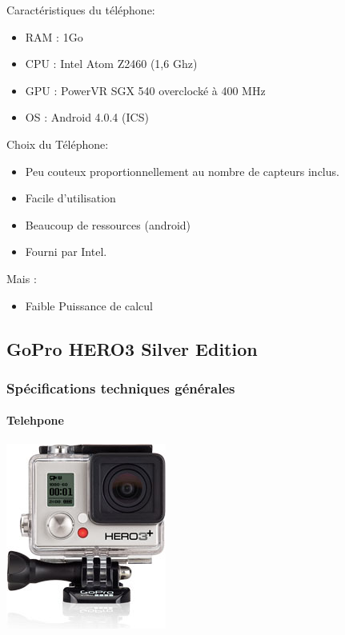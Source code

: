 \documentclass[transparent]{beamer}
\begin{document}
\begin{frame} 
	\begin{block}{Caractéristiques du téléphone:}
			\begin{itemize}
				\item RAM : 1Go
				\item CPU : Intel Atom Z2460 (1,6 Ghz)
				\item GPU : PowerVR SGX 540 overclocké à 400 MHz
				\item OS : Android 4.0.4 (ICS)
			\end{itemize}
	\end{block}
	\begin{block}{Choix du Téléphone:}
			\begin{itemize}
				\item Peu couteux proportionnellement au nombre de capteurs inclus.
				\item Facile d'utilisation
				\item Beaucoup de ressources (android)
				\item Fourni par Intel.
			\end{itemize}
	\end{block}
	\begin{block}{Mais :}
			\begin{itemize}
				\item Faible Puissance de calcul
			\end{itemize}
	\end{block}

\end{frame}

\subsection{GoPro HERO3 Silver Edition}
\begin{frame}
	\frametitle{Spécifications techniques générales}
	\framesubtitle{Telehpone}
	\begin{center}
 	\includegraphics[height=0.8\textheight]{images/gopro.jpg} 
	\end{center}

\end{frame}
\end{document}

